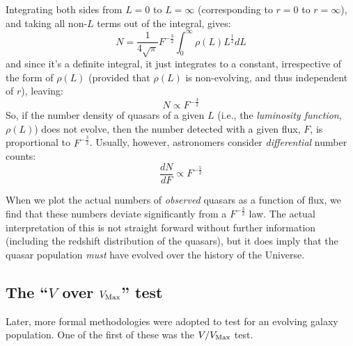 \documentclass[11pt]{article}
\begin{document}
Integrating both sides from $L=0$ to $L=\infty$ (corresponding to
$r=0$ to $r=\infty$), and taking all non-$L$ terms out of the integral,
gives:
\begin{equation}
N = \frac{1}{4\sqrt{\pi}}F^{-\frac{3}{2}}\int_0^\infty\rho(L)L^{\frac{1}{2}}dL
\end{equation} 
and since it's a definite integral, it just integrates to a constant,
irrespective of the form of $\rho(L)$ (provided that $\rho(L)$ is
non-evolving, and thus independent of $r$), leaving:
\begin{equation}
N \propto F^{-\frac{3}{2}}
\end{equation} 
So, if the number density of quasars of a given $L$ (i.e., the {\it
  luminosity function}, $\rho(L)$) does not evolve, then the number
detected with a given flux, $F$, is proportional to
$F^{-\frac{3}{2}}$. Usually, however, astronomers consider {\it
  differential} number counts:
\begin{equation}
\frac{dN}{dF}\propto F^{-\frac{5}{2}}
\end{equation}

When we plot the actual numbers of {\it observed} quasars as a function
of flux, we find that these numbers deviate significantly from a $F^{-\frac{3}{2}}$ law. The actual interpretation of this is not straight forward without further information (including the redshift distribution of the quasars), but it does imply that the quasar population {\it must} have evolved over the history of the Universe.

\subsection{ The ``$V$ over $V_{\rm Max}$'' test}
Later, more formal methodologies were adopted to test for an evolving
galaxy population. One of the first of these was the $V/V_{\rm Max}$
test.
\end{document}
